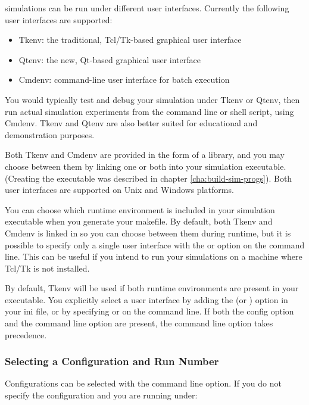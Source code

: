 {\opp} simulations can be run under different user interfaces.
Currently the following user interfaces are supported:

\begin{itemize}
  \item Tkenv: the traditional, Tcl/Tk-based graphical user interface
  \item Qtenv: the new, Qt-based graphical user interface
  \item Cmdenv: command-line user interface for batch execution
\end{itemize}

You would typically test and debug your simulation under Tkenv or Qtenv,
then run actual simulation experiments from the command line or shell
script, using Cmdenv. Tkenv and Qtenv are also better suited for
educational and demonstration purposes.

Both Tkenv and Cmdenv are provided in the form of a library, and
you may choose between them by linking one or both into your
simulation executable. (Creating the executable was described in
chapter \ref{cha:build-sim-progs}). Both user interfaces
are supported on Unix and Windows platforms.

You can choose which runtime environment is included in your simulation
executable when you generate your makefile. By default, both Tkenv and
Cmdenv is linked in so you can choose between them during runtime, but it
is possible to specify only a single user interface with the  or  option on the  command line.
This can be useful if you intend to run your simulations on a machine where
Tcl/Tk is not installed.

By default, Tkenv will be used if both runtime environments are present in
your executable. You explicitly select a user interface by adding the
 (or ) option in your ini file, or
by specifying  or  on the command line. If
both the config option and the command line option are present, the command
line option takes precedence.

\subsubsection{Selecting a Configuration and Run Number}
\label{sec:run-sim:selecting-configuration-and-run-number}

Configurations can be selected with the  command line option.
If you do not specify the configuration and you are running under:

